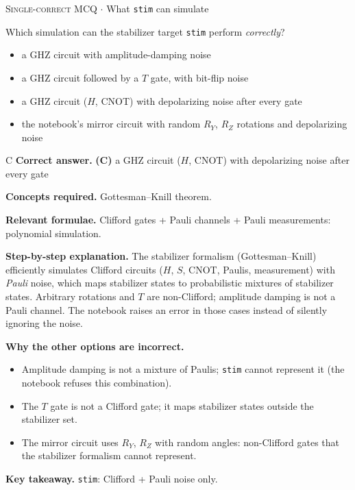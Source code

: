 \documentclass[11pt,a4paper]{article}
\newcommand{\optlabel}[1]{\textbf{(#1)}}
\newcommand{\correctlabel}[1]{\textcolor{okgreen}{\textbf{(#1)}\,\ding{51}}}
\newenvironment{qitem}[1]{\begin{list}{}{\setlength{\leftmargin}{3.3em}\setlength{\labelwidth}{3.1em}%
  \setlength{\labelsep}{0.2em}\setlength{\topsep}{3pt}\setlength{\parsep}{3pt}}\item[\textbf{Q.#1}\hfill]}{\end{list}}
\newcommand{\qsep}{\par\vspace{2pt}{\color{black!15}\hrule}\vspace{4pt}}
\newcommand{\qmeta}[2]{{\footnotesize\color{black!60}\textsc{#1} \;$\cdot$\; #2}\par}
\begin{document}
\begin{qitem}{49}
\qmeta{Single-correct MCQ}{What \texttt{stim} can simulate}
Which simulation can the stabilizer target \texttt{stim} perform \emph{correctly}?
\begin{itemize}[leftmargin=2.6em, labelsep=0.4em, itemsep=2pt, topsep=3pt]
\item[\optlabel{A}] a GHZ circuit with amplitude-damping noise
\item[\optlabel{B}] a GHZ circuit followed by a $T$ gate, with bit-flip noise
\item[\correctlabel{C}] a GHZ circuit ($H$, CNOT) with depolarizing noise after every gate
\item[\optlabel{D}] the notebook's mirror circuit with random $R_Y$, $R_Z$ rotations and depolarizing noise
\end{itemize}
\end{qitem}
\begin{solbox}{C}
\textbf{\color{brand}Correct answer.} \textcolor{okgreen}{\textbf{(C)}} a GHZ circuit ($H$, CNOT) with depolarizing noise after every gate

\textbf{\color{brand}Concepts required.} Gottesman--Knill theorem.

\textbf{\color{brand}Relevant formulae.} Clifford gates + Pauli channels + Pauli measurements: polynomial simulation.

\textbf{\color{brand}Step-by-step explanation.} The stabilizer formalism (Gottesman--Knill) efficiently simulates Clifford circuits ($H$, $S$, CNOT, Paulis, measurement) with \emph{Pauli} noise, which
maps stabilizer states to probabilistic mixtures of stabilizer states. Arbitrary rotations and $T$ are non-Clifford; amplitude damping is not a Pauli channel.
The notebook raises an error in those cases instead of silently ignoring the noise.

\textbf{\color{brand}Why the other options are incorrect.}
\begin{itemize}[leftmargin=2.4em, itemsep=1pt, topsep=2pt]
\item[\textbf{(A)}] Amplitude damping is not a mixture of Paulis; \texttt{stim} cannot represent it (the notebook refuses this combination).
\item[\textbf{(B)}] The $T$ gate is not a Clifford gate; it maps stabilizer states outside the stabilizer set.
\item[\textbf{(D)}] The mirror circuit uses $R_Y$, $R_Z$ with random angles: non-Clifford gates that the stabilizer formalism cannot represent.
\end{itemize}
\textbf{\color{brand}Key takeaway.} \texttt{stim}: Clifford + Pauli noise only.
\end{solbox}
\qsep
\end{document}
